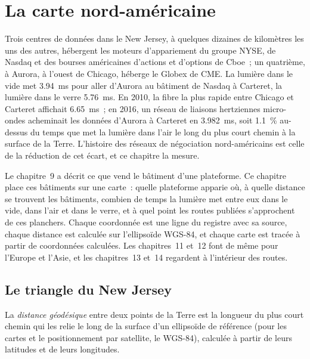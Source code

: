 \chapter{La carte nord-américaine}\label{ch:nw:the-north-american-map}

Trois centres de données dans le New Jersey, à quelques dizaines de kilomètres les uns des autres, hébergent les moteurs d'appariement du groupe NYSE, de Nasdaq et des bourses américaines
d'actions et d'options de Cboe~; un quatrième, à Aurora, à l'ouest de Chicago, héberge le Globex de CME. La lumière dans le vide met \qty{3.94}{\milli\second}
pour aller d'Aurora au bâtiment de Nasdaq à Carteret, la lumière dans le verre \qty{5.76}{\milli\second}. En 2010, la fibre la plus rapide entre
Chicago et Carteret affichait \qty{6.65}{\milli\second}~; en 2016, un réseau de liaisons hertziennes micro-ondes acheminait les données d'Aurora à Carteret en
\qty{3.982}{\milli\second}, soit 1.1~\% au-dessus du temps que met la lumière dans l'air le long du plus court chemin à la surface de la Terre. L'histoire des réseaux de
négociation nord-américains est celle de la réduction de cet écart, et ce chapitre la mesure.

Le chapitre~9 a décrit ce que vend le bâtiment d'une plateforme. Ce chapitre place ces bâtiments sur une carte~: quelle plateforme apparie où, à quelle distance se trouvent les
bâtiments, combien de temps la lumière met entre eux dans le vide, dans l'air et dans le verre, et à quel point les routes publiées s'approchent de ces planchers.
Chaque coordonnée est une ligne du registre avec sa source, chaque distance est calculée sur l'ellipsoïde WGS-84, et chaque carte est tracée
à partir de coordonnées calculées. Les chapitres~11 et~12 font de même pour l'Europe et l'Asie, et les chapitres~13 et~14 regardent à l'intérieur des routes.

\section{Le triangle du New Jersey}

\begin{definition}\label{def:nw:the-north-american-map:geodesic}
La \emph{distance géodésique} entre deux points de la Terre est la longueur du plus court chemin qui les relie le long
de la surface d'un ellipsoïde de référence (pour les cartes et le positionnement par satellite, le WGS-84), calculée à partir de leurs latitudes et de leurs longitudes.
\end{definition}

